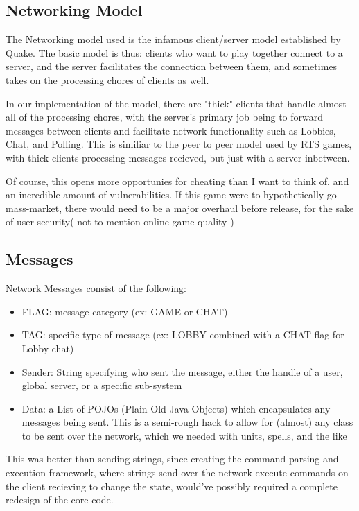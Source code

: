 \documentclass[12pt,a4paper]{article}
\begin{document}
\subsection{Networking Model}

The Networking model used is the infamous client/server model established by Quake. 
The basic model is thus: clients who want to play together connect to a server, and the server facilitates the connection between them, 
and sometimes takes on the processing chores of clients as well.

In our implementation of the model, there are "thick" clients that handle almost all of the processing chores, 
with the server's primary job being to forward messages between clients and facilitate network functionality such as Lobbies, Chat, and Polling.
This is similiar to the peer to peer model used by RTS games, with thick clients processing messages recieved, but just with a server inbetween.

Of course, this opens more opportunies for cheating than I want to think of, and an incredible amount of vulnerabilities. If this game were to 
hypothetically go mass-market, there would need to be a major overhaul before release, for the sake of user security( not to mention online game quality )

\subsection{Messages}

Network Messages consist of the following:
\begin{itemize}
\item{FLAG:  message category (ex: GAME or CHAT)}
\item{TAG:  specific type of message (ex: LOBBY combined with a CHAT flag for Lobby chat)}
\item{Sender: String specifying who sent the message, either the handle of a user, global server, or a specific sub-system}
\item{Data: a List of POJOs (Plain Old Java Objects) which encapsulates any messages being sent. This is a semi-rough hack to allow for
 (almost) any class to be sent over the network, which we needed with units, spells, and the like}
\end{itemize}

This was better than sending strings, since creating the command parsing and execution framework, where strings send over the network
execute commands on the client recieving to change the state, would've possibly required a complete redesign of the core code.
\end{document}
